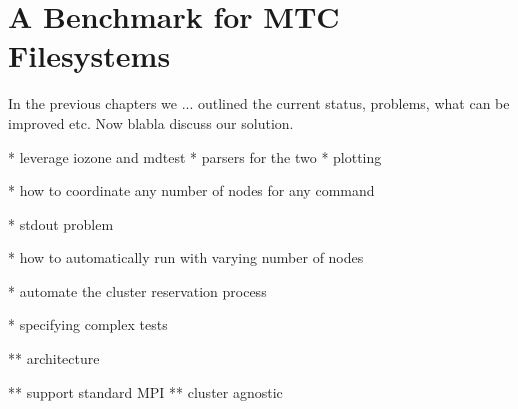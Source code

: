 
\chapter{A Benchmark for MTC Filesystems} %

\label{Chapter3} %


In the previous chapters we ... outlined the current status, problems, what can be improved etc. Now blabla discuss our solution.

* leverage iozone and mdtest
* parsers for the two
* plotting

* how to coordinate any number of nodes for any command

* stdout problem

* how to automatically run with varying number of nodes

* automate the cluster reservation process

* specifying complex tests

** architecture


** support standard MPI
** cluster agnostic
